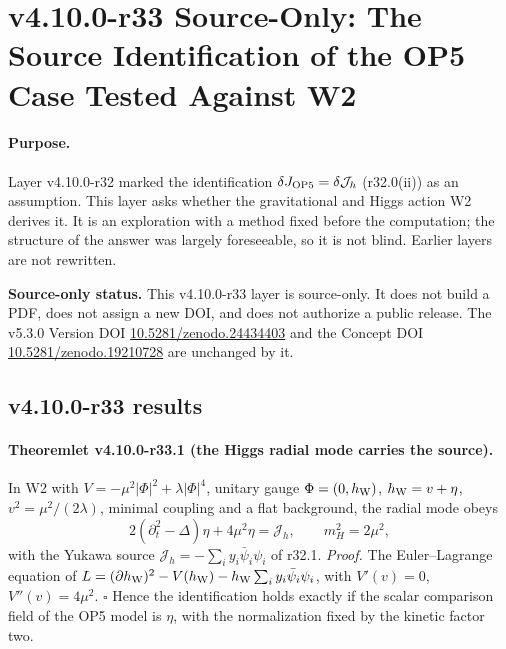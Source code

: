 \clearpage
\section*{v4.10.0-r33 Source-Only: The Source Identification of the OP5 Case Tested Against W2}
\label{sec:v4100-r33-assumption40}

\paragraph{Purpose.}
Layer v4.10.0-r32 marked the identification \(\delta J_{\rm OP5}=\delta\mathcal J_h\) (r32.0(ii)) as an assumption.  This layer asks whether the
gravitational and Higgs action W2 derives it.  It is an exploration with a method fixed before the computation; the structure of the
answer was largely foreseeable, so it is not blind.  Earlier layers are not rewritten.

\noindent\textbf{Source-only status.}
This v4.10.0-r33 layer is source-only.  It does not build a PDF, does not assign a new DOI,
and does not authorize a public release.  The v5.3.0 Version DOI
\href{https://doi.org/10.5281/zenodo.24434403}{10.5281/zenodo.24434403} and the Concept DOI
\href{https://doi.org/10.5281/zenodo.19210728}{10.5281/zenodo.19210728} are unchanged by it.

\subsection*{v4.10.0-r33 results}
\label{subsec:v4100-r33-results}

\paragraph{Theoremlet v4.10.0-r33.1 (the Higgs radial mode carries the source).}
In W2 with \(V=-\mu^2|\Phi|^2+\lambda|\Phi|^4\), unitary gauge \(\Phi=(0,h_{\rm W})\), \(h_{\rm W}=v+\eta\), \(v^2=\mu^2/(2\lambda)\), minimal coupling and a flat
background, the radial mode obeys
\[
 2(\partial_t^2-\Delta)\eta+4\mu^2\eta=\mathcal J_h,\qquad m_H^2=2\mu^2,
\]
with the Yukawa source \(\mathcal J_h=-\sum_iy_i\bar\psi_i\psi_i\) of r32.1.  \emph{Proof.} The Euler--Lagrange equation of
\(L=(\partial h_{\rm W})^2-V(h_{\rm W})-h_{\rm W}\sum_iy_i\bar\psi_i\psi_i\), with \(V'(v)=0\), \(V''(v)=4\mu^2\).  \(\square\)
Hence the identification holds exactly if the scalar comparison field of the OP5 model is \(\eta\), with the normalization fixed by the
kinetic factor two.

